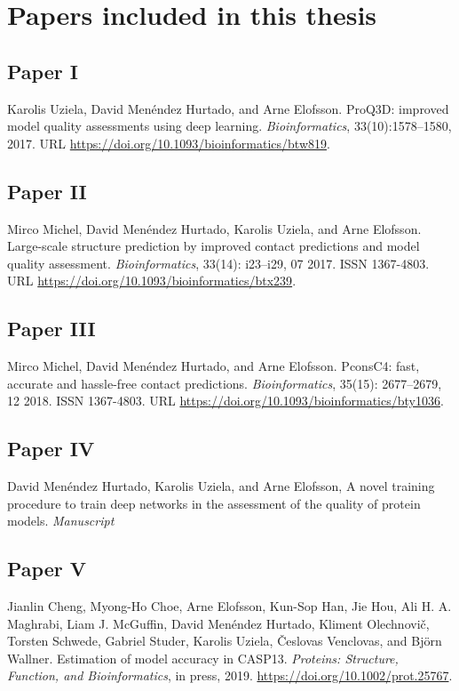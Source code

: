 \chapter*{Papers included in this thesis}

\section*{Paper \textcolor[cmyk]{0, 0.87, 0.68, 0.32}{I}}
Karolis Uziela\first, David Menéndez Hurtado\first, and Arne Elofsson.
ProQ3D: improved model quality assessments using deep learning. \textit{Bioinformatics}, 33(10):1578–1580, 2017.
URL \url{ https://doi.org/10.1093/bioinformatics/btw819}.

\section*{Paper  \textcolor[cmyk]{0, 0.87, 0.68, 0.32}{II}}
Mirco Michel, David Menéndez Hurtado, Karolis Uziela, and Arne Elofsson.
Large-scale structure
prediction by improved contact predictions and model quality assessment. \textit{Bioinformatics}, 33(14):
i23–i29, 07 2017. ISSN 1367-4803. URL
\url{https://doi.org/10.1093/bioinformatics/btx239}.


\section*{Paper \textcolor[cmyk]{0, 0.87, 0.68, 0.32}{III}}
Mirco Michel\first, David Menéndez Hurtado\first, and Arne Elofsson. PconsC4: fast, accurate and hassle-free
contact predictions. \textit{Bioinformatics}, 35(15): 2677–2679, 12 2018. ISSN 1367-4803. URL \url{https://doi.org/10.1093/bioinformatics/bty1036}.


\section*{Paper \textcolor[cmyk]{0, 0.87, 0.68, 0.32}{IV}}
David Menéndez Hurtado, Karolis Uziela, and Arne Elofsson, A novel training procedure to train deep networks in the assessment of the quality of protein models. \emph{Manuscript}


\section*{Paper \textcolor[cmyk]{0, 0.87, 0.68, 0.32}{V}}

Jianlin Cheng\first, Myong-Ho Choe\first, Arne Elofsson\first, Kun-Sop Han\first, Jie Hou\first, Ali H. A. Maghrabi\first, Liam J.
McGuffin\first, David Menéndez Hurtado\first, Kliment Olechnovič\first, Torsten Schwede\first, Gabriel Studer\first, Karolis
Uziela\first, Česlovas Venclovas\first, and Björn Wallner\first. Estimation of model accuracy in CASP13. \emph{Proteins:
Structure, Function, and Bioinformatics}, in press, 2019. \url{https://doi.org/10.1002/prot.25767}.

